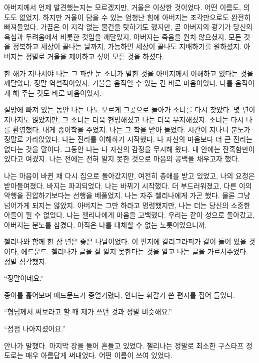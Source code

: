 \begin{letter}
아버지께서 언제 발견했는지는 모르겠지만, 거울은 이상한 것이었다. 어떤 이름도, 의도도 없었지. 하지만 거울이 담을 수 있는 엄청난 힘에 아버지는 조각만으로도 완전히 빠져들었다. 가끔은 이 지각 없는 물건을 탓하기도 했지만, 곧 아버지의 광기가 당신의 욕심과 두려움에서 비롯한 것임을 깨달았지. 아버지는 죽음을 원치 않으셨지. 모든 것을 정복하고 세상이 끝나는 날까지, 가능하면 세상이 끝나도 지배하기를 원하셨지. 아버지는 정말로 거울을 제어하고 싶어 모든 것을 하셨다.

한 해가 지나서야 나는 그 파란 눈 소녀가 말한 것을 아버지께서 이해하고 있다는 것을 깨달았다. 정말 역설적이었지. 거울을 움직일 수 있는 건 바로 마음이었다. 나를 움직이게 해 주는 것도 바로 마음이었지.

절망에 빠져 있는 동안 나는 나도 모르게 그곳으로 돌아가 소녀를 다시 찾았다. 몇 년이 지나지도 않았지만, 그 소녀는 더욱 현명해졌고 나는 더욱 무지해졌지. 소녀는 다시 나를 환영했다. 내게 종이학을 주었지. 나는 그 학을 받아 들었다. 시간이 지나니 분노가 정말로 가라앉았다. 나는 진리를 이해하기 시작했다. 나 자신의 마음보다 더 큰 진리는 없다는 것을 말이다. 그동안 나는 나 자신의 감정을 무시해 왔다. 내 안에는 잔혹함만이 있다고 여겼지. 나는 전에는 전혀 알지 못한 것으로 마음의 공백을 채우고자 했다.

나는 마음이 바뀐 채 다시 집으로 돌아갔지만, 여전히 총애를 받고 있었고, 나의 요청은 받아들여졌다. 바지는 파괴되었다. 나는 바뀌기 시작했다. 더 부드러워졌고, 다른 이의 악행을 진압하기보다는 선행을 베풀었지. 나는 자주 첼리나에게 가곤 했다. 물론 그냥 넘어가게 되지는 않았지. 아버지는 그만 하라고 명령했지만, 나는 더는 당신의 소중한 아들이 될 수 없었다. 나는 첼리나에게 마음을 고백했다. 우리는 같이 성으로 돌아갔고, 아버지는 분노를 삼켰다. 아직은 나를 대체할 수 없는 노릇이었으니까.

첼리나와 함께 한 삼 년은 좋은 나날이었다. 이 편지에 칼리그라피가 같이 들어 있을 것이다, 에드문드. 첼리나가 글을 잘 알지 못한다는 것을 알고 나는 글을 가르쳐주었다. 정말 심각했지.

\end{letter}

``정말이네요.''

종이를 훑어보며 에드문드가 중얼거렸다. 안나는 휘갈겨 쓴 편지를 집어 들었다.

``형님께서 써보라고 할 때 제가 쓰던 것과 정말 비슷해요.''

``점점 나아지셨어요.''

안나가 말했다. 마지막 장을 들어 흔들고 있었다. 첼리나는 정말로 최소한 구스타프 정도로는 매우 아름답게 써내었다. 어떤 이름이 쓰여 있었다.

